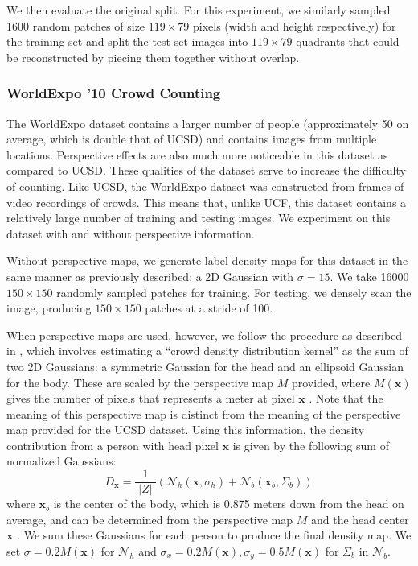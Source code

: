 \documentclass[10pt,twocolumn,letterpaper]{article}
\begin{document}
We then evaluate the original split. For this experiment, we similarly sampled 1600 random patches of size \(119 \times 79\) pixels (width and height respectively) for the training set and split the test set images into \(119 \times 79\) quadrants that could be reconstructed by piecing them together without overlap.

\subsubsection{WorldExpo '10 Crowd Counting}

The WorldExpo dataset \cite{zhang2015cross} contains a larger number of people (approximately 50 on average, which is double that of UCSD) and contains images from multiple locations. Perspective effects are also much more noticeable in this dataset as compared to UCSD. These qualities of the dataset serve to increase the difficulty of counting. Like UCSD, the WorldExpo dataset was constructed from frames of video recordings of crowds. This means that, unlike UCF, this dataset contains a relatively large number of training and testing images. We experiment on this dataset with and without perspective information.

Without perspective maps, we generate label density maps for this dataset in the same manner as previously described: a 2D Gaussian with \(\sigma = 15\). We take 16000 \(150 \times 150\) randomly sampled patches for training. For testing, we densely scan the image, producing \(150 \times 150\) patches at a stride of 100.

When perspective maps are used, however, we follow the procedure as described in \cite{zhang2015cross}, which involves estimating a ``crowd density distribution kernel'' as the sum of two 2D Gaussians: a symmetric Gaussian for the head and an ellipsoid Gaussian for the body. These are scaled by the perspective map \(M\) provided, where \(M(\mathbf{x})\) gives the number of pixels that represents a meter at pixel \(\mathbf{x}\) \cite{zhang2015cross}. Note that the meaning of this perspective map is distinct from the meaning of the perspective map provided for the UCSD dataset. Using this information, the density contribution from a person with head pixel \(\mathbf{x}\) is given by the following sum of normalized Gaussians:
\begin{equation}
    D_\mathbf{x} = \frac{1}{\lvert \lvert Z \rvert \rvert }(\mathcal{N}_h(\mathbf{x}, \sigma_h) + \mathcal{N}_b(\mathbf{x}_b, \Sigma_b)) 
\end{equation}
where \(\mathbf{x}_b\) is the center of the body, which is 0.875 meters down from the head on average, and can be determined from the perspective map \(M\) and the head center \(\mathbf{x}\) \cite{zhang2015cross}.
We sum these Gaussians for each person to produce the final density map. We set \(\sigma = 0.2M(\mathbf{x})\) for \(\mathcal{N}_h\) and \(\sigma_x = 0.2M(\mathbf{x}), \sigma_y = 0.5M(\mathbf{x})\) for \(\Sigma_b\) in \(\mathcal{N}_b\).
\end{document}
